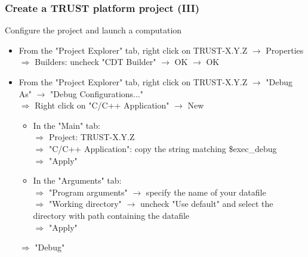 \documentclass[10pt, hyperref={unicode=true,pdfusetitle, bookmarks=true,bookmarksnumbered=false,bookmarksopen=false, breaklinks=false,pdfborder={0 0 1},backref=true,colorlinks=true,linkcolor=darkblue,pageanchor, urlcolor=darkblue}]{beamer}
\begin{document}
\begin{frame}
\frametitle{Create a TRUST platform project (III)}

\begin{block}{Configure the project and launch a computation}
\begin{itemize}
\item From the "Project Explorer" tab, right click on TRUST-X.Y.Z $\rightarrow$ Properties \\
  $\Rightarrow$ Builders: uncheck "CDT Builder" $\rightarrow$ OK $\rightarrow$ OK 
\item From the "Project Explorer" tab, right click on TRUST-X.Y.Z $\rightarrow$ "Debug As" $\rightarrow$ "Debug Configurations..."\\
  $\Rightarrow$ Right click on "C/C++ Application" $\rightarrow$ New 
  \begin{itemize}
  \item In the "Main" tab: \\
  $\Rightarrow$ Project: TRUST-X.Y.Z \\
  $\Rightarrow$ "C/C++ Application": copy the string matching \$exec\_debug \\
  $\Rightarrow$ "Apply" \\
  \item In the "Arguments" tab:\\
  $\Rightarrow$ "Program arguments" $\rightarrow$ specify the name of your datafile \\
  $\Rightarrow$ "Working directory" $\rightarrow$ uncheck "Use default" and select the directory with path containing the datafile \\
  $\Rightarrow$ "Apply"
  \end{itemize}
  $\Rightarrow$ "Debug" 
\end{itemize}
\end{block}

\end{frame}


\end{document}
